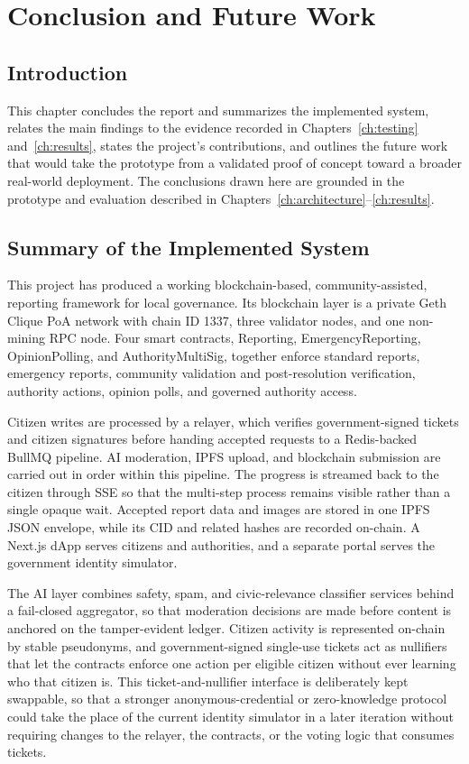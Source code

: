\chapter{Conclusion and Future Work}
\label{ch:conclusions}

\section{Introduction}
\label{sec:conclusion-introduction}

This chapter concludes the report and summarizes the implemented system, relates the main findings to the evidence recorded in Chapters~\ref{ch:testing} and~\ref{ch:results}, states the project's contributions, and outlines the future work that would take the prototype from a validated proof of concept toward a broader real-world deployment. The conclusions drawn here are grounded in the prototype and evaluation described in Chapters~\ref{ch:architecture}--\ref{ch:results}.

\section{Summary of the Implemented System}
\label{sec:implemented-system-summary}

This project has produced a working blockchain-based, community-assisted, reporting framework for local governance. Its blockchain layer is a private Geth Clique \ac{PoA} network with chain ID 1337, three validator nodes, and one non-mining RPC node. Four smart contracts,   {Reporting},   {EmergencyReporting},   {OpinionPolling}, and   {AuthorityMultiSig}, together enforce standard reports, emergency reports, community validation and post-resolution verification, authority actions, opinion polls, and governed authority access.

Citizen writes are processed by a relayer, which verifies government-signed tickets and citizen signatures before handing accepted requests to a Redis-backed BullMQ pipeline. AI moderation, IPFS upload, and blockchain submission are carried out in order within this pipeline. The progress is streamed back to the citizen through \ac{SSE} so that the multi-step process remains visible rather than a single opaque wait. Accepted report data and images are stored in one IPFS JSON envelope, while its CID and related hashes are recorded on-chain. A Next.js dApp serves citizens and authorities, and a separate portal serves the government identity simulator.

The AI layer combines safety, spam, and civic-relevance classifier services behind a fail-closed aggregator, so that moderation decisions are made before content is anchored on the tamper-evident ledger. Citizen activity is represented on-chain by stable pseudonyms, and government-signed single-use tickets act as nullifiers that let the contracts enforce one action per eligible citizen without ever learning who that citizen is. This ticket-and-nullifier interface is deliberately kept swappable, so that a stronger anonymous-credential or zero-knowledge protocol could take the place of the current identity simulator in a later iteration without requiring changes to the relayer, the contracts, or the voting logic that consumes tickets.

